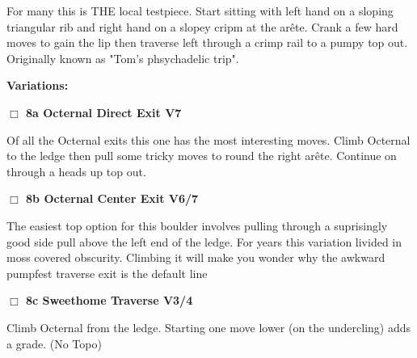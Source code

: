 \begin{multicols}{2}
\begin{adjustwidth}{1.3em}{}
For many this is THE local testpiece. Start sitting with left hand on a sloping triangular rib and right hand on a slopey cripm at the arête. Crank a few hard moves to gain the lip then traverse left through a crimp rail to a pumpy top out. Originally known as "Tom's phsychadelic trip".
\end{adjustwidth}


\begin{adjustwidth}{0.5cm}{}				
\needspace{4em}
\textbf{Variations:} \newline

\needspace{2em}
\label{vr:Octernal Direct Exit}
\colorbox{Goldenrod!20}{
\parbox{0.95\linewidth}{
\hspace{-1ex}\textbf{$\Box$
8a Octernal Direct Exit V7  
}}}
\begin{adjustwidth}{1.3em}{}			

Of all the Octernal exits this one has the most interesting moves. Climb Octernal to the ledge then pull some tricky moves to round the right arête. Continue on through a heads up top out.
\end{adjustwidth}




\needspace{2em}
\label{vr:Octernal Center Exit}
\colorbox{Goldenrod!20}{
\parbox{0.95\linewidth}{
\hspace{-1ex}\textbf{$\Box$
8b Octernal Center Exit V6/7  
}}}
\begin{adjustwidth}{1.3em}{}			

The easiest top option for this boulder involves pulling through a suprisingly good side pull above the left end of the ledge. For years this variation livided in moss covered obscurity. Climbing it will make you wonder why the awkward pumpfest traverse exit is the default line
\end{adjustwidth}




\needspace{2em}
\label{vr:Sweethome Traverse}
\colorbox{RoyalBlue!20}{
\parbox{0.95\linewidth}{
\hspace{-1ex}\textbf{$\Box$
8c Sweethome Traverse V3/4  
}}}
\begin{adjustwidth}{1.3em}{}			

Climb Octernal from the ledge. Starting one move lower (on the undercling) adds a grade.
  (No Topo)
\end{adjustwidth}



\end{adjustwidth}
	\end{multicols}
\label{tp:Methlab Backside}
  \begin{landscape}
	
  \end{landscape}

